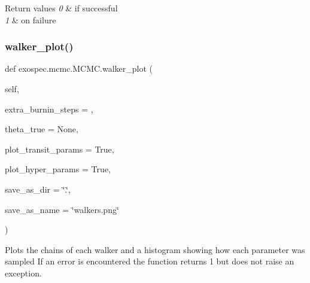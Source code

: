 \begin{DoxyRetVals}{Return values}
{\em 0} & if successful \\
\hline
{\em 1} & on failure \\
\hline
\end{DoxyRetVals}
\mbox{\label{classexospec_1_1mcmc_1_1_m_c_m_c_a741c2882baef53c1fa19b2c086ec8261}} 
\subsubsection{\texorpdfstring{walker\+\_\+plot()}{walker\_plot()}}
{\footnotesize\ttfamily def exospec.\+mcmc.\+M\+C\+M\+C.\+walker\+\_\+plot (\begin{DoxyParamCaption}\item[{}]{self,  }\item[{}]{extra\+\_\+burnin\+\_\+steps = {},  }\item[{}]{theta\+\_\+true = {\ttfamily None},  }\item[{}]{plot\+\_\+transit\+\_\+params = {\ttfamily True},  }\item[{}]{plot\+\_\+hyper\+\_\+params = {\ttfamily True},  }\item[{}]{save\+\_\+as\+\_\+dir = {\ttfamily \char`\"{}.\char`\"{}},  }\item[{}]{save\+\_\+as\+\_\+name = {\ttfamily \char`\"{}walkers.png\char`\"{}} }\end{DoxyParamCaption})}



Plots the chains of each walker and a histogram showing how each parameter was sampled If an error is encountered the function returns 1 but does not raise an exception. 

